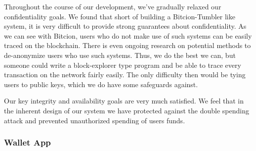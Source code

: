\documentclass[12pt]{article}
\begin{document}
Throughout the course of our development, we've gradually relaxed our confidentiality goals. We found that short of building a Bitcion-Tumbler like system, it is very difficult to provide strong guarantees about confidentiality. As we can see with Bitcion, users who do not make use of such systems can be easily traced on the blockchain. There is even ongoing research on potential methods to de-anonymize users who use such systems. Thus, we do the best we can, but someone could write a block-explorer type program and be able to trace every transaction on the network fairly easily. The only difficulty then would be tying users to public keys, which we do have some safeguards against.

Our key integrity and availability goals are very much satisfied. We feel that in the inherent design of our system we have protected against the double spending attack and prevented unauthorized spending of users funds.

\subsubsection*{Wallet App}
\end{document}
